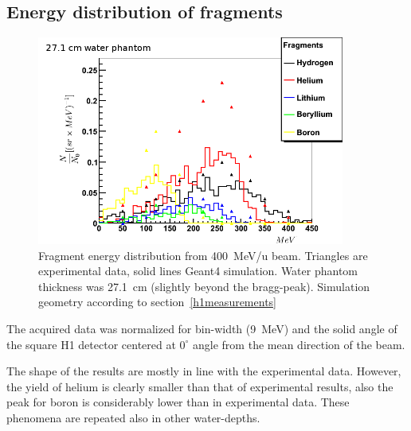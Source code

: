 \subsection{Energy distribution of fragments}
\begin{figure}[h] 
\begin{center}
\includegraphics[width=0.9\textwidth]{images/plots/fragmentEnergy/fragmentEnergyDistr.png}  
\caption{\label{fig:fragmentEnergyDistr} Fragment energy distribution from 400~MeV/u beam. Triangles are experimental data, solid lines Geant4 simulation. Water phantom thickness was 27.1~cm (slightly beyond the bragg-peak). Simulation geometry according to section~\ref{h1measurements}}
\end{center}
\end{figure}
The acquired data was normalized for bin-width (9~MeV) and the solid angle of the square H1 detector centered at $0^{\circ}$ angle from the mean direction of the beam.

The shape of the results are mostly in line with the experimental data. However, the yield of helium is clearly smaller than that of experimental results, also the peak for boron is considerably lower than in experimental data. These phenomena are repeated also in other water-depths.

